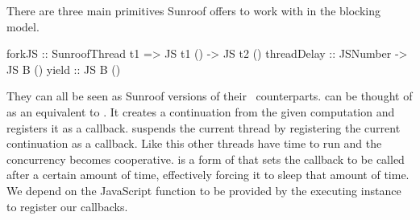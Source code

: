 \begin{comment}
The compiler offers two functions to choose in which
model the \JS-monad shall be compiled.
\begin{Code}
sunroofCompileJSA :: (Sunroof a) 
                  => CompilerOpts -> String -> JS A a -> IO String
sunroofCompileJSB :: CompilerOpts -> String -> JS B () -> IO String
\end{Code}
\end{comment}

There are three main primitives Sunroof offers to work with in
the blocking model.
\begin{Code}
forkJS      :: SunroofThread t1 => JS t1 () -> JS t2 ()
threadDelay :: JSNumber -> JS B ()
yield       :: JS B ()
\end{Code}
They can all be seen as Sunroof versions of their \IO~counterparts.
 can be thought of as an equivalent to .
It creates a continuation from the given computation and registers 
it as a callback.  suspends the current thread by 
registering the current continuation as a callback. Like this 
other threads have time to run and the concurrency becomes 
cooperative.  is a form of  that sets 
the callback to be called after a certain amount of time,
effectively forcing it to sleep that amount of time.
We depend on the JavaScript function  
to be provided
by the executing instance to register our callbacks.

